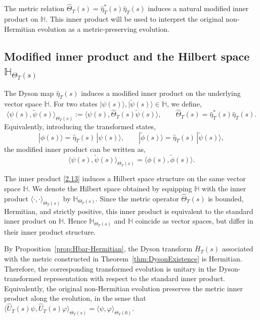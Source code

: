 \documentclass[pdflatex,sn-mathphys-num]{sn-jnl}
\theoremstyle{thmstyleone}
\theoremstyle{thmstyletwo}
\theoremstyle{thmstylethree}
\begin{document}
The metric relation
\(
\hat\Theta_T(s)=\hat\eta_T^{*}(s)\hat\eta_T(s)
\)
induces a natural modified inner product on \(\mathbb H\). This inner product
will be used to interpret the original non-Hermitian evolution as a
metric-preserving evolution.

\subsection{Modified inner product and the Hilbert space $\mathbb{H}_{\Theta_T(s)}$}

The Dyson map $\hat\eta_T(s)$ induces a modified inner product on the underlying
vector space $\mathbb{H}$. For two states $|\psi(s)\rangle,|\tilde\psi(s)\rangle\in\mathbb{H}$,
we define,
\begin{equation}\label{2.13}
 \langle \psi(s),\tilde\psi(s)\rangle_{\Theta_T(s)}
 :=
 \langle \psi(s),\hat\Theta_T(s)\tilde\psi(s)\rangle ,
 \qquad
 \hat\Theta_T(s)=\hat\eta_T^{*}(s)\hat\eta_T(s).
\end{equation}
\noindent Equivalently, introducing the transformed states,
\begin{equation}\label{2.14}
 |\phi(s)\rangle = \hat\eta_T(s)\,|\psi(s)\rangle,
 \qquad
 |\tilde\phi(s)\rangle = \hat\eta_T(s)\,|\tilde\psi(s)\rangle ,
\end{equation}
the modified inner product can be written as,
\[
\langle \psi(s),\tilde\psi(s)\rangle_{\Theta_T(s)}
=
\langle \phi(s),\tilde\phi(s)\rangle .
\]

The inner product \eqref{2.13} induces a Hilbert space structure on the same
vector space $\mathbb{H}$. We denote the Hilbert space
obtained by equipping $\mathbb{H}$ with the inner product
$\langle\cdot,\cdot\rangle_{\Theta_T(s)}$ by $\mathbb{H}_{\Theta_T(s)}$. Since the metric operator
$\hat\Theta_T(s)$ is bounded, Hermitian, and strictly positive,
this inner product is equivalent to the standard inner product on $\mathbb{H}$.
Hence $\mathbb{H}_{\Theta_T(s)}$ and $\mathbb{H}$ coincide as vector spaces,
but differ in their inner product structure.

By Proposition~\ref{prop:Hbar-Hermitian}, the Dyson transform $\bar H_T(s)$ associated with the metric
constructed in Theorem~\ref{thm:DysonExistence} is Hermitian. Therefore, the corresponding transformed evolution is unitary in the Dyson-transformed
representation with respect to the standard inner product. Equivalently, the original non-Hermitian evolution preserves the metric inner product
along the evolution, in the sense that
\(
\langle \hat U_T(s)\psi,\hat U_T(s)\varphi\rangle_{\Theta_T(s)}
=
\langle \psi,\varphi\rangle_{\Theta_T(0)}.
\)
\end{document}
